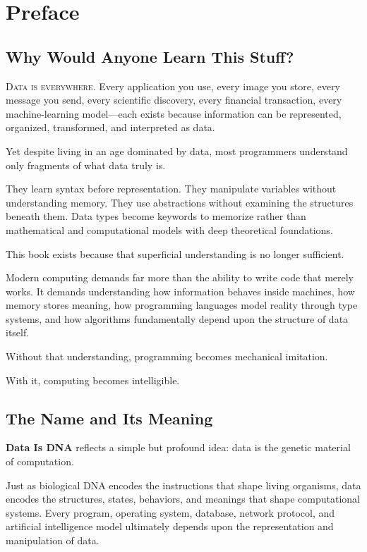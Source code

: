 \chapter*{Preface}

\section*{Why Would Anyone Learn This Stuff?}

\lettrine{D}{ata is everywhere}. Every application you use, every image you store, every message you send, every scientific discovery, every financial transaction, every machine-learning model—each exists because information can be represented, organized, transformed, and interpreted as data.

Yet despite living in an age dominated by data, most programmers understand only fragments of what data truly is.

They learn syntax before representation. They manipulate variables without understanding memory. They use abstractions without examining the structures beneath them. Data types become keywords to memorize rather than mathematical and computational models with deep theoretical foundations.

This book exists because that superficial understanding is no longer sufficient.

Modern computing demands far more than the ability to write code that merely works. It demands understanding how information behaves inside machines, how memory stores meaning, how programming languages model reality through type systems, and how algorithms fundamentally depend upon the structure of data itself.

Without that understanding, programming becomes mechanical imitation.

With it, computing becomes intelligible.

\section*{The Name and Its Meaning}

\textbf{Data Is DNA} reflects a simple but profound idea: data is the genetic material of computation.

Just as biological DNA encodes the instructions that shape living organisms, data encodes the structures, states, behaviors, and meanings that shape computational systems. Every program, operating system, database, network protocol, and artificial intelligence model ultimately depends upon the representation and manipulation of data.


